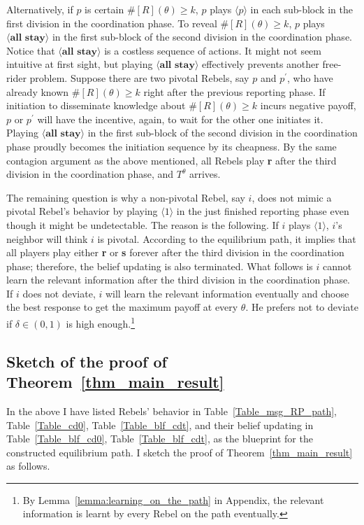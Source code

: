 \documentclass[12pt,letter]{article}
\theoremstyle{definition}
\theoremstyle{remark}
\theoremstyle{claim}
\begin{document}
Alternatively, if $p$ is certain $\#[R](\theta)\geq k$, $p$ plays $\langle p \rangle$ in each sub-block in the first division in the coordination phase. To reveal $\#[R](\theta)\geq k$, $p$ plays $\langle \textbf{all stay} \rangle$ in the first sub-block of the second division in the coordination phase. Notice that $\langle \textbf{all stay} \rangle$ is a costless sequence of actions. It might not seem intuitive at first sight, but playing $\langle \textbf{all stay} \rangle$ effectively prevents another free-rider problem. Suppose there are two pivotal Rebels, say $p$ and $p^{'}$, who have already known $\#[R](\theta)\geq k$ right after the previous reporting phase. If initiation to disseminate knowledge about $\#[R](\theta)\geq k$ incurs negative payoff, $p$ or $p^{'}$ will have the incentive, again, to wait for the other one initiates it. Playing $\langle \textbf{all stay} \rangle$ in the first sub-block of the second division in the coordination phase proudly becomes the initiation sequence by its cheapness. By the same contagion argument as the above mentioned, all Rebels play \textbf{r} after the third division in the coordination phase, and $T^{\theta}$ arrives.

The remaining question is why a non-pivotal Rebel, say $i$, does not mimic a pivotal Rebel's behavior by playing $\langle 1 \rangle$ in the just finished reporting phase even though it might be undetectable. The reason is the following. If $i$ plays $\langle 1 \rangle$, $i$'s neighbor will think $i$ is pivotal. According to the equilibrium path, it implies that all players play either \textbf{r} or \textbf{s} forever after the third division in the coordination phase; therefore, the belief updating is also terminated. What follows is $i$ cannot learn the relevant information after the third division in the coordination phase. If $i$ does not deviate, $i$ will learn the relevant information eventually and choose the best response to get the maximum payoff at every $\theta$. He prefers not to deviate if $\delta\in(0,1)$ is high enough.\footnote{By Lemma~\ref{lemma:learning_on_the_path} in Appendix, the relevant information is learnt by every Rebel on the path eventually.} 


\subsection{Sketch of the proof of Theorem~\ref{thm_main_result}}

In the above I have listed Rebels' behavior in Table~\ref{Table_msg_RP_path}, Table~\ref{Table_cd0}, Table~\ref{Table_blf_cdt}, and their belief updating in Table~\ref{Table_blf_cd0}, Table~\ref{Table_blf_cdt}, as the blueprint for the constructed equilibrium path. I sketch the proof of Theorem~\ref{thm_main_result} as follows.
\end{document}
